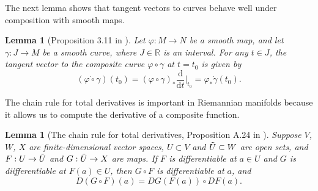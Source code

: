 \documentclass[a4paper]{article}
\numberwithin{equation}{section}
\newtheorem{lemma}[theorem]{Lemma}
\theoremstyle{definition}
\begin{document}
The next lemma shows that tangent vectors to curves behave well under composition with smooth maps. 
\begin{lemma}[Proposition 3.11 in \cite{L2003}]\label{lem_acurve}
	Let $\varphi:M\to N$ be a smooth map, and let $\gamma:J \to M$ be a smooth curve, where $J\in \mathbb{R}$ is an interval. For any $t\in J$, the tangent vector to the composite curve $\varphi \circ \gamma$ at $t = t_0$ is given by
	\begin{equation*}
		(\dot{\varphi\circ \gamma})(t_0)=(\varphi\circ \gamma)_*\frac{\mathrm{d}}{\mathrm{d}t}\bigg|_{t_0}=\varphi_*\dot{\gamma}(t_0).
	\end{equation*}
\end{lemma}
The chain rule for total derivatives is important in Riemannian manifolds because it allows us to compute the derivative of a composite function.
\begin{lemma}[The chain rule for total derivatives, Proposition A.24 in \cite{L2003}]
	Suppose $V$, $W$, $X$ are finite-dimensional vector spaces, $U\subset V$ and $\Tilde{U}\subset W$ are open sets, and $F:U \to\Tilde{U}$ and $G:\Tilde{U}\to X$ are maps. If $F$ is differentiable at $a \in U$ and $G$ is diifferentiable at $F(a)\in U$, then $G\circ F$ is differentiable at $a$, and
	\begin{equation}\label{eqn_chain_rule}
		D(G \circ F)(a) = DG(F(a)) \circ DF(a). 
	\end{equation}
\end{lemma}
\end{document}
